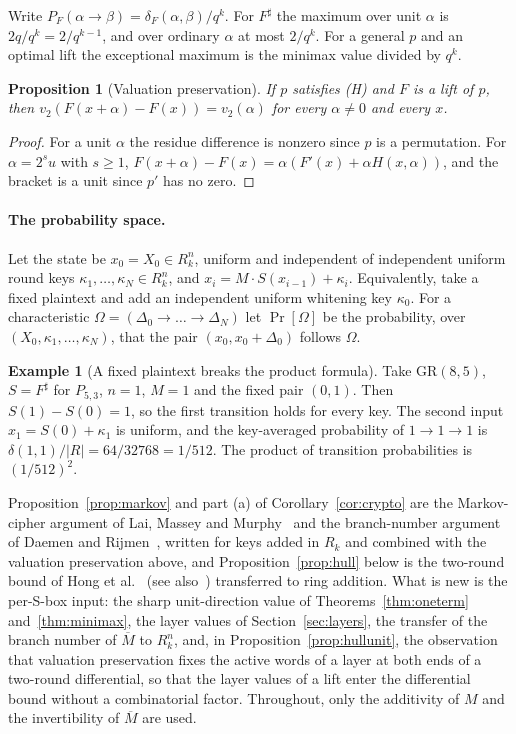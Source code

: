 \documentclass[11pt]{article}
\newtheorem{proposition}[theorem]{Proposition}
\theoremstyle{definition}
\newtheorem{example}[theorem]{Example}
\theoremstyle{remark}
\newcommand{\GR}{\mathrm{GR}}
\newcommand{\ol}[1]{\overline{#1}}
\begin{document}
Write $P_F(\alpha\to\beta)=\delta_F(\alpha,\beta)/q^k$. For $F^\sharp$ the maximum over unit $\alpha$ is
$2q/q^k=2/q^{k-1}$, and over ordinary $\alpha$ at most $2/q^k$. For a general $p$ and an optimal lift the
exceptional maximum is the minimax value divided by $q^k$.

\begin{proposition}[Valuation preservation]\label{prop:valuation}
If $p$ satisfies (H) and $F$ is a lift of $p$, then $v_2(F(x+\alpha)-F(x))=v_2(\alpha)$ for every $\alpha\ne0$ and every $x$.
\end{proposition}
\begin{proof}
For a unit $\alpha$ the residue difference is nonzero since $p$ is a permutation. For $\alpha=2^su$ with
$s\ge1$, $F(x+\alpha)-F(x)=\alpha(F'(x)+\alpha H(x,\alpha))$, and the bracket is a unit since $p'$ has no zero.
\end{proof}

\paragraph{The probability space.}
Let the state be $x_0=X_0\in R_k^n$, uniform and independent of independent uniform round keys
$\kappa_1,\dots,\kappa_N\in R_k^n$, and $x_i=M\cdot S(x_{i-1})+\kappa_i$. Equivalently, take a fixed plaintext
and add an independent uniform whitening key $\kappa_0$. For a characteristic
$\Omega=(\Delta_0\to\dots\to\Delta_N)$ let $\Pr[\Omega]$ be the probability, over $(X_0,\kappa_1,\dots,\kappa_N)$,
that the pair $(x_0,x_0+\Delta_0)$ follows $\Omega$.

\begin{example}[A fixed plaintext breaks the product formula]\label{ex:fixed}
Take $\GR(8,5)$, $S=F^\sharp$ for $P_{5,3}$, $n=1$, $M=1$ and the fixed pair $(0,1)$. Then $S(1)-S(0)=1$, so the first
transition holds for every key. The second input $x_1=S(0)+\kappa_1$ is uniform, and the key-averaged
probability of $1\to1\to1$ is $\delta(1,1)/|R|=64/32768=1/512$. The product of transition probabilities is
$(1/512)^2$.
\end{example}

Proposition~\ref{prop:markov} and part (a) of Corollary~\ref{cor:crypto} are the Markov-cipher argument of Lai,
Massey and Murphy~\cite{LMM} and the branch-number argument of Daemen and Rijmen~\cite{DRwide,DR}, written for keys
added in $R_k$ and combined with the valuation preservation above, and Proposition~\ref{prop:hull} below is the
two-round bound of Hong et al.~\cite{HLLSCC} (see also~\cite{PSLL}) transferred to ring addition. What is new is the
per-S-box input: the sharp unit-direction value of Theorems~\ref{thm:oneterm} and~\ref{thm:minimax}, the layer values of
Section~\ref{sec:layers}, the transfer of the branch number of $\ol M$ to $R_k^n$, and, in
Proposition~\ref{prop:hullunit}, the observation that valuation preservation fixes the active words of a layer at both
ends of a two-round differential, so that the layer values of a lift enter the differential bound without a
combinatorial factor. Throughout, only the additivity of $M$ and the invertibility of $\ol M$ are used.
\end{document}
